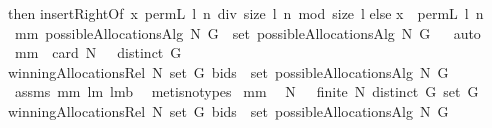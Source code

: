 \begin{isabellebody}
then\isanewline
{\isacharparenleft}insertRightOf{}\ x\ {\isacharparenleft}permL\ l\ {\isacharparenleft}n\ div\ size\ l{\isacharparenright}{\isacharparenright}\ {\isacharparenleft}n\ mod\ {\isacharparenleft}size\ l{\isacharparenright}{\isacharparenright}{\isacharparenright}\isanewline
else\isanewline
{\isacharparenleft}x\ {\isacharhash}\ {\isacharparenleft}permL\ l\ n{\isacharparenright}{\isacharparenright}\isanewline
{\isacharparenright}{\isachardoublequoteclose}\isanewline
\isanewline
{}\isamarkupfalse%
\ mm{}{}{\isacharcolon}\ {\isachardoublequoteopen}possibleAllocationsAlg{}\ N\ G\ {\isacharequal}\ set\ {\isacharparenleft}possibleAllocationsAlg{}\ N\ G{\isacharparenright}{\isachardoublequoteclose}%
\isadelimproof
\ %
\endisadelimproof
%
\isatagproof
{}\isamarkupfalse%
\ auto%
\endisatagproof
{\isafoldproof}%
%
\isadelimproof
%
\endisadelimproof
\isanewline
{}\isamarkupfalse%
\ mm{}{}{\isacharcolon}\ \ {\isachardoublequoteopen}card\ N\ {\isachargreater}\ {}{\isachardoublequoteclose}\ {\isachardoublequoteopen}distinct\ G{\isachardoublequoteclose}\ \ \isanewline
{\isachardoublequoteopen}winningAllocationsRel\ N\ {\isacharparenleft}set\ G{\isacharparenright}\ bids\ {\isasymsubseteq}\ set\ {\isacharparenleft}possibleAllocationsAlg{}\ N\ G{\isacharparenright}{\isachardoublequoteclose}\isanewline
%
\isadelimproof
%
\endisadelimproof
%
\isatagproof
{}\isamarkupfalse%
\ assms\ mm{}{}\ lm{}{}\ lm{}{}b\ \isamarkupfalse%
\ {\isacharparenleft}metis{\isacharparenleft}no{\isacharunderscore}types{\isacharparenright}{\isacharparenright}%
\endisatagproof
{\isafoldproof}%
%
\isadelimproof
\isanewline
%
\endisadelimproof
{}\isamarkupfalse%
\ mm{}{}{\isacharcolon}\ \ \isanewline
{\isachardoublequoteopen}N\ {\isasymnoteq}\ {\isacharbraceleft}{\isacharbraceright}{\isachardoublequoteclose}\ {\isachardoublequoteopen}finite\ N{\isachardoublequoteclose}\ {\isachardoublequoteopen}distinct\ G{\isachardoublequoteclose}\ {\isachardoublequoteopen}set\ G\ {\isasymnoteq}\ {\isacharbraceleft}{\isacharbraceright}{\isachardoublequoteclose}\ \isanewline
{\isachardoublequoteopen}winningAllocationsRel\ N\ {\isacharparenleft}set\ G{\isacharparenright}\ bids\ {\isasyminter}\ set\ {\isacharparenleft}possibleAllocationsAlg{}\ N\ G{\isacharparenright}\ {\isasymnoteq}\ {\isacharbraceleft}{\isacharbraceright}{\isachardoublequoteclose}\isanewline

\end{isabellebody}
